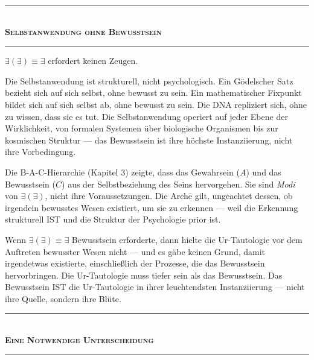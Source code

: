 \documentclass[10pt, openany, oneside]{book}
\renewcommand{\normalsize}{\fontsize{10}{13}\selectfont}
\begin{document}
\begin{center}
    \rule{0.3\textwidth}{0.4pt}\\[0.5em]
    {\normalsize\bfseries\scshape Selbstanwendung ohne Bewusstsein}\\[0.3em]
    \rule{0.3\textwidth}{0.4pt}
\end{center}

\vspace{1em}

\noindent $\exists(\exists) \equiv \exists$ erfordert keinen Zeugen.

Die Selbstanwendung ist strukturell, nicht psychologisch. Ein Gödelscher Satz bezieht sich auf sich selbst, ohne bewusst zu sein. Ein mathematischer Fixpunkt bildet sich auf sich selbst ab, ohne bewusst zu sein. Die DNA repliziert sich, ohne zu wissen, dass sie es tut. Die Selbstanwendung operiert auf jeder Ebene der Wirklichkeit, von formalen Systemen über biologische Organismen bis zur kosmischen Struktur --- das Bewusstsein ist ihre höchste Instanziierung, nicht ihre Vorbedingung.

Die B-A-C-Hierarchie (Kapitel 3) zeigte, dass das Gewahrsein ($A$) und das Bewusstsein ($C$) aus der Selbstbeziehung des Seins hervorgehen. Sie sind \textit{Modi} von $\exists(\exists)$, nicht ihre Voraussetzungen. Die Arch\={e} gilt, ungeachtet dessen, ob irgendein bewusstes Wesen existiert, um sie zu erkennen --- weil die Erkennung strukturell IST und die Struktur der Psychologie prior ist.

Wenn $\exists(\exists) \equiv \exists$ Bewusstsein erforderte, dann hielte die Ur-Tautologie vor dem Auftreten bewusster Wesen nicht --- und es gäbe keinen Grund, damit irgendetwas existierte, einschließlich der Prozesse, die das Bewusstsein hervorbringen. Die Ur-Tautologie muss tiefer sein als das Bewusstsein. Das Bewusstsein IST die Ur-Tautologie in ihrer leuchtendsten Instanziierung --- nicht ihre Quelle, sondern ihre Blüte.

\vspace{1.5em}


\begin{center}
    \rule{0.3\textwidth}{0.4pt}\\[0.5em]
    {\normalsize\bfseries\scshape Eine Notwendige Unterscheidung}\\[0.3em]
    \rule{0.3\textwidth}{0.4pt}
\end{center}
\end{document}
